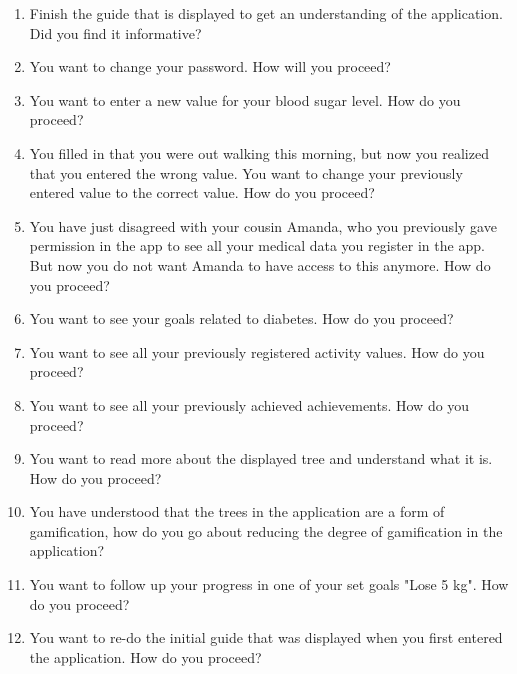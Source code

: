 \begin{enumerate}
\item Finish the guide that is displayed to get an understanding of the application. Did you find it informative?  
\item You want to change your password. How will you proceed? 
\item You want to enter a new value for your blood sugar level. How do you proceed?
\item You filled in that you were out walking this morning, but now you realized that you entered the wrong value. You want to change your previously entered value to the correct value. How do you proceed?
\item You have just disagreed with your cousin Amanda, who you previously gave permission in the app to see all your medical data you register in the app. But now you do not want Amanda to have access to this anymore. How do you proceed? 
\item You want to see your goals related to diabetes. How do you proceed?
\item You want to see all your previously registered activity values. How do you proceed? 
\item You want to see all your previously achieved achievements. How do you proceed?
\item You want to read more about the displayed tree and understand what it is. How do you proceed?
\item You have understood that the trees in the application are a form of gamification, how do you go about reducing the degree of gamification in the application?
\item You want to follow up your progress in one of your set goals "Lose 5 kg". How do you proceed?
\item You want to re-do the initial guide that was displayed when you first entered the application. How do you proceed? \\
\end{enumerate} 

